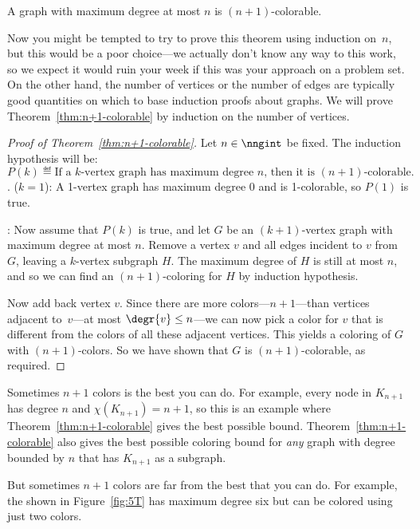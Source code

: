 \begin{theorem}\label{thm:n+1-colorable}
A graph with maximum degree at most $n$ is $(n+1)$-colorable.
\end{theorem}

Now you might be tempted to try to prove this theorem using induction
on~$n$, but this would be a poor choice---we actually don't know any
way to this work, so we expect it would ruin your week if this was
your approach on a problem set.  On the other hand, the number of
vertices or the number of edges are typically good quantities on which
to base induction proofs about graphs.  We will prove
Theorem~\ref{thm:n+1-colorable} by induction on the number of
vertices.

\begin{proof}[Proof of Theorem~\ref{thm:n+1-colorable}]
Let $n \in \nngint$ be fixed.  The induction hypothesis will be:
\[
P(k) \eqdef \text{If a $k$-vertex graph has maximum degree $n$, then
  it is $(n+1)$-colorable}.
\].
 ($k=1$): A 1-vertex graph has maximum degree
0 and is 1-colorable, so $P(1)$ is true.

: Now assume that $P(k)$ is true, and
let $G$ be an $(k+1)$-vertex graph with maximum degree at most $n$.
Remove a vertex $v$ and all edges incident to $v$ from $G$, leaving a
$k$-vertex subgraph $H$.  The maximum degree of $H$ is still at most
$n$, and so we can find an $(n+1)$-coloring for $H$ by induction
hypothesis.

Now add back vertex $v$.  Since there are more colors---$n+1$---than
vertices adjacent to~$v$---at most $\degr{v}\leq n$---we can now pick
a color for $v$ that is different from the colors of all these
adjacent vertices.  This yields a coloring of $G$ with $(n+1)$-colors.
So we have shown that $G$ is $(n+1)$-colorable, as required.
\end{proof}

Sometimes $n+1$ colors is the best you can do.  For example, every
node in $K_{n+1}$ has degree $n$ and $\chi(K_{n+1}) = n+1$, so this is
an example where Theorem~\ref{thm:n+1-colorable} gives the best
possible bound.  Theorem~\ref{thm:n+1-colorable} also gives the best
possible coloring bound for \emph{any} graph with degree bounded by
$n$ that has $K_{n+1}$ as a subgraph.

But sometimes $n+1$ colors are far from the best that you can do.  For
example, the  shown in Figure~\ref{fig:5T} has
maximum degree six but can be colored using just two colors.

